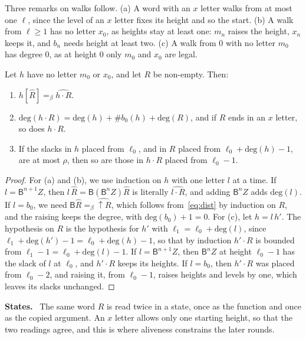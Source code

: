 \documentclass[a4paper,english]{lipics-v2021}
\newcommand{\B}{\mathsf{B}}
\newcommand{\eqb}{=_{\beta}}
\newcommand{\hatw}[1]{\widehat{#1}}
\newcommand{\up}{{\uparrow}}
\newcommand{\dg}{\mathrm{deg}}
\newcommand{\nb}[1]{\#b_0(#1)}
\newcommand{\runin}[1]{\par\smallskip\noindent\textbf{#1}\ }
\begin{document}
Three remarks on walks follow. (a) A word with an $x$ letter walks from at most one $\ell$, since the level of an $x$ letter fixes its height and so the start. (b) A walk from $\ell \geq 1$ has no letter $x_0$, as heights stay at least one: $m_n$ raises the height, $x_n$ keeps it, and $b_n$ needs height at least two. (c) A walk from $0$ with no letter $m_0$ has degree $0$, as at height $0$ only $m_0$ and $x_0$ are legal.

\begin{lemma}[Fold]\label{lem:pop}
Let $h$ have no letter $m_0$ or $x_0$, and let $R$ be non-empty. Then:
\begin{enumerate}
\item[(a)] $h[\hatw{R}] \eqb \widehat{h\cdot R}$.
\item[(b)] $\dg(h\cdot R) = \dg(h) + \nb{h} + \dg(R)$, and if $R$ ends in an $x$ letter, so does $h\cdot R$.
\item[(c)] If the slacks in $h$ placed from $\ell_0$, and in $R$ placed from $\ell_0 + \dg(h) - 1$, are at most $\rho$, then so are those in $h\cdot R$ placed from $\ell_0 - 1$.
\end{enumerate}
\end{lemma}

\begin{proof}
For (a) and (b), we use induction on $h$ with one letter $l$ at a time. If $l = \B^{n+1}Z$, then $l\,\hatw{R} = \B(\B^nZ)\hatw{R}$ is literally $\widehat{l\cdot R}$, and adding $\B^nZ$ adds $\dg(l)$. If $l = b_0$, we need $\B\hatw{R} \eqb \widehat{\up R}$, which follows from~\eqref{eq:dist} by induction on $R$, and the raising keeps the degree, with $\dg(b_0)+1 = 0$. For (c), let $h = l\,h'$. The hypothesis on $R$ is the hypothesis for $h'$ with $\ell_1 = \ell_0 + \dg(l)$, since $\ell_1 + \dg(h') - 1 = \ell_0 + \dg(h) - 1$, so that by induction $h'\cdot R$ is bounded from $\ell_1 - 1 = \ell_0 + \dg(l) - 1$. If $l = \B^{n+1}Z$, then $\B^nZ$ at height $\ell_0-1$ has the slack of $l$ at $\ell_0$, and $h'\cdot R$ keeps its heights. If $l = b_0$, then $h'\cdot R$ was placed from $\ell_0-2$, and raising it, from $\ell_0-1$, raises heights and levels by one, which leaves its slacks unchanged.
\end{proof}

\runin{States.} The same word $R$ is read twice in a state, once as the function and once as the copied argument. An $x$ letter allows only one starting height, so that the two readings agree, and this is where aliveness constrains the later rounds.
\end{document}

